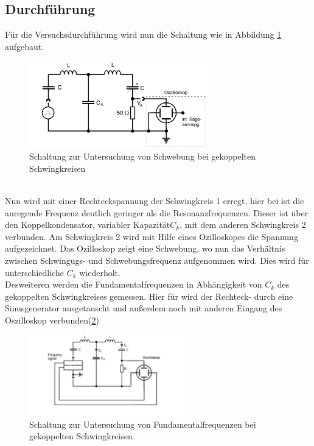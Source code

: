 \subsection{Durchführung}
\label{subsec:Durchführung}
Für die Versuchsdurchführung wird nun die Schaltung
wie in Abbildung \ref{abb:schwebungsaufbau} aufgebaut.
\begin{figure}[h]
   \centering
   \includegraphics[width=0.7\textwidth]{Aufbau_a).PNG}
   \caption{Schaltung zur Untersuchung von Schwebung bei gekoppelten Schwingkreisen \cite{skript}}
   \label{abb:schwebungsaufbau}
\end{figure}\\
Nun wird mit einer Rechteckspannung der
Schwingkreis 1 erregt, hier bei ist die anregende Frequenz
deutlich geringer als die Resonanzfrequenzen.
Dieser ist über den Koppelkondensator,
variabler Kapazität$C_k$, mit dem anderen Schwingkreis 2
verbunden. Am Schwingkreis 2 wird mit
Hilfe eines Ozilloskopes die Spannung aufgezeichnet.
Das Ozilloskop zeigt eine Schwebung, wo nun das Verhältnis
zwischen Schwingugs- und Schwebungsfrequenz aufgenommen wird.
Dies wird für unterschiedliche $C_k$ wiederholt.
\\
Desweiteren werden die Fundamentalfrequenzen
in Abhängigkeit von $C_k$
des gekoppelten Schwingkreises gemessen.
Hier für wird der Rechteck- durch
eine Sinusgenerator ausgetauscht und außerdem
noch mit anderen Eingang des Oszilloskop verbunden(\ref{abb:fundamentalaufbau})
\begin{figure}[h]
  \centering
  \includegraphics[width=0.6\textwidth]{physik.PNG}
  \caption{Schaltung zur Untersuchung von Fundamentalfrequenzen bei gekoppelten Schwingkreisen \cite{skript}}
  \label{abb:fundamentalaufbau}
\end{figure}\\
